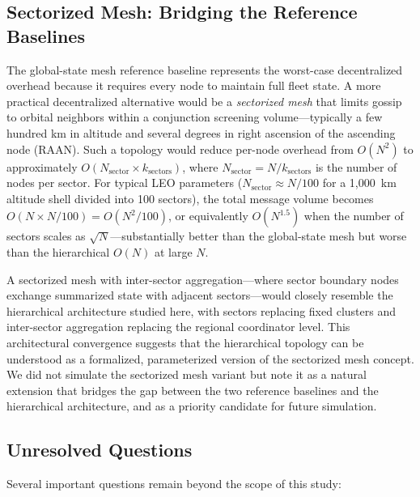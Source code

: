 \documentclass[journal]{IEEEtran}
\begin{document}
\subsection{Sectorized Mesh: Bridging the Reference Baselines}

The global-state mesh reference baseline represents the worst-case decentralized overhead because it requires every node to maintain full fleet state. A more practical decentralized alternative would be a \emph{sectorized mesh} that limits gossip to orbital neighbors within a conjunction screening volume---typically a few hundred km in altitude and several degrees in right ascension of the ascending node (RAAN). Such a topology would reduce per-node overhead from $O(N^2)$ to approximately $O(N_{\text{sector}} \times k_{\text{sectors}})$, where $N_{\text{sector}} = N / k_{\text{sectors}}$ is the number of nodes per sector. For typical LEO parameters ($N_{\text{sector}} \approx N/100$ for a 1{,}000~km altitude shell divided into 100 sectors), the total message volume becomes $O(N \times N/100) = O(N^2/100)$, or equivalently $O(N^{1.5})$ when the number of sectors scales as $\sqrt{N}$---substantially better than the global-state mesh but worse than the hierarchical $O(N)$ at large $N$.

A sectorized mesh with inter-sector aggregation---where sector boundary nodes exchange summarized state with adjacent sectors---would closely resemble the hierarchical architecture studied here, with sectors replacing fixed clusters and inter-sector aggregation replacing the regional coordinator level. This architectural convergence suggests that the hierarchical topology can be understood as a formalized, parameterized version of the sectorized mesh concept. We did not simulate the sectorized mesh variant but note it as a natural extension that bridges the gap between the two reference baselines and the hierarchical architecture, and as a priority candidate for future simulation.

\subsection{Unresolved Questions}

Several important questions remain beyond the scope of this study:
\end{document}

